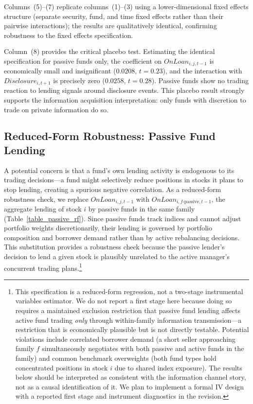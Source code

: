 Columns~(5)--(7) replicate columns~(1)--(3) using a lower-dimensional fixed effects structure (separate security, fund, and time fixed effects rather than their pairwise interactions); the results are qualitatively identical, confirming robustness to the fixed effects specification.

Column~(8) provides the critical placebo test. Estimating the identical specification for passive funds only, the coefficient on $OnLoan_{i,j,t-1}$ is economically small and insignificant ($0.0208$, $t = 0.23$), and the interaction with $\mathit{Disclosure}_{i,t+1}$ is precisely zero ($0.0258$, $t = 0.28$). Passive funds show no trading reaction to lending signals around disclosure events. This placebo result strongly supports the information acquisition interpretation: only funds with discretion to trade on private information do so.

\subsection{Reduced-Form Robustness: Passive Fund Lending}

A potential concern is that a fund's own lending activity is endogenous to its trading decisions---a fund might selectively reduce positions in stocks it plans to stop lending, creating a spurious negative correlation. As a reduced-form robustness check, we replace $OnLoan_{i,j,t-1}$ with $\mathit{OnLoan}_{i,f\text{-passive},t-1}$, the aggregate lending of stock $i$ by passive funds in the same family (Table~\ref{table_passive_rf}). Since passive funds track indices and cannot adjust portfolio weights discretionarily, their lending is governed by portfolio composition and borrower demand rather than by active rebalancing decisions. This substitution provides a robustness check because the passive lender's decision to lend a given stock is plausibly unrelated to the active manager's concurrent trading plans.\footnote{This specification is a reduced-form regression, not a two-stage instrumental variables estimator. We do not report a first stage here because doing so requires a maintained exclusion restriction that passive fund lending affects active fund trading \emph{only} through within-family information transmission---a restriction that is economically plausible but is not directly testable. Potential violations include correlated borrower demand (a short seller approaching family $f$ simultaneously negotiates with both passive and active funds in the family) and common benchmark overweights (both fund types hold concentrated positions in stock $i$ due to shared index exposure). The results below should be interpreted as consistent with the information channel story, not as a causal identification of it. We plan to implement a formal IV design with a reported first stage and instrument diagnostics in the revision.}

